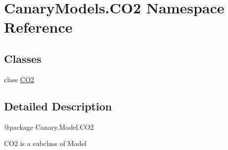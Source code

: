 \hypertarget{namespace_canary_models_1_1_c_o2}{\section{Canary\-Models.\-C\-O2 Namespace Reference}
\label{namespace_canary_models_1_1_c_o2}
}
\subsection*{Classes}
\begin{DoxyCompactItemize}
\item 
class \hyperlink{class_canary_models_1_1_c_o2_1_1_c_o2}{C\-O2}
\end{DoxyCompactItemize}


\subsection{Detailed Description}
\begin{DoxyVerb}@package Canary.Model.CO2

CO2 is a subclass of Model
\end{DoxyVerb}
 